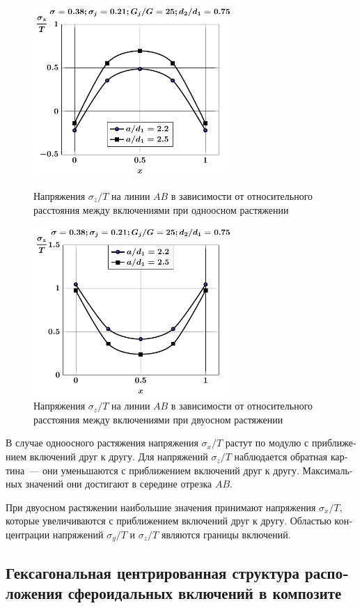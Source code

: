 \begin{russian}
\begin{figure}[h!]
\centering\footnotesize
\parbox[b]{7.5cm}{\centering\includegraphics[width=7.6cm]{inc9-a-d75-g25-t1-sig_z.pdf}
\caption{Напряжения $\sigma_z/T$ на линии $AB$ в зависимости от относительного расстояния между включениями при одноосном растяжении
\label{f:9:73}}}\hfil\hfil
\parbox[b]{7.5cm}{\centering\includegraphics[width=7.6cm]{inc9-a-d75-g25-t2-sig_z.pdf}
\caption{Напряжения $\sigma_z/T$ на линии $AB$ в зависимости от относительного расстояния между включениями при двуосном растяжении
\label{f:9:74}}}
\end{figure}

В случае одноосного растяжения напряжения $\sigma_x/T$ растут по модулю с приближением включений друг к другу. Для напряжений $\sigma_z/T$ наблюдается обратная картина~--- они уменьшаются с приближением включений друг к другу. Максимальных значений они достигают в середине отрезка $AB$.

При двуосном растяжении наибольшие значения принимают напряжения $\sigma_x/T$, которые увеличиваются с приближением включений друг к другу. Областью концентрации напряжений $\sigma_y/T$ и $\sigma_z/T$ являются границы включений.

\subsection{Гексагональная центрированная структура расположения сфероидальных включений в композите}


\end{russian}
